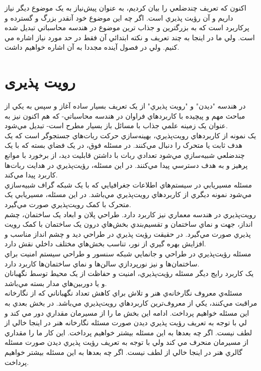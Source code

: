 \documentclass{book}
\begin{document}
                اکنون که تعريف چندضلعي را بيان کرديم، به عنوان پيش‌نياز به يک موضوع ديگر نياز داريم و آن رؤيت پذيري است. اگر چه اين موضوع خود آنقدر بزرگ و گسترده و پرکاربرد است که به بزرگترين و جذاب ترين موضوع در هندسه محاسباتي تبديل شده است. ولي ما در اينجا به چند تعريف و نکته ابتدائي آن فقط در حد مورد نياز اشاره مي کنيم. ولي در فصول آينده مجددا به آن اشاره خواهيم داشت.
                \section*{رویت پذیری}
                در هندسه "ديدن" و "رويت پذيري" از يک تعريف بسيار ساده آغاز و سپس به يکي از مباحث مهم و پيچيده با کاربردهاي فراوان در هندسه محاسباتي- که هم اکنون نيز به عنوان يک زمينه علمي جذاب با مسائل باز بسيار مطرح است- تبديل مي‌شود.\\
                
                يک نمونه از کاربردهاي رويت‌پذيري، بهينه‌سازي حرکت ربات‌هاي جستجوگر است که يک هدف ثابت يا متحرک را دنبال مي‌کنند. در مسئله فوق، در يک فضاي بسته که با يک چندضلعي شبيه‌سازي مي‌شود  تعدادي ربات‌ با داشتن قابليت ديد، از برخورد با موانع پرهيز و به هدف دسترسي پيدا مي‌کنند. در اين مسئله، رؤيت‌پذيري در هدايت ربات‌ها کاربرد پيدا مي‌کند.\\
                مسئله مسير‌يابي در سيستم‌هاي اطلاعات جغرافيايي که با يک شبکه گراف شبيه‌سازي مي‌شود نمونه ديگري از کاربرد‌هاي رويت‌پذيري مي‌باشد. در اين مسئله، مسيريابي يک متحرک با کمک رويت‌پذيري صورت مي‌گيرد.\\
                رويت‌پذيري در هندسه معماري نيز کاربرد دارد. طراحي پلان و ابعاد يک ساختمان، چشم انداز، جهت و نماي ساختمان و تقسيم‌بندي بخش‌هاي درون يک ساختمان با کمک رويت پذيري صورت مي‌گيرد. در حقيقت رؤيت پذيري در طراحي ديد و چشم انداز مناسب و افزايش  بهره گيري از نور، تناسب بخش‌هاي مختلف داخلي نقش دارد. \\
                مسئله رؤيت‌پذيري در طراحي و جانمايي شبکه سنسور و طراحي سيستم امنيت براي ساختمان‌ها و نيز نورپردازي سالن‌ها و نماي ساختمان‌ها کاربرد دارد.\\
                يک کاربرد رايج ديگر مسئله رؤيت‌پذيري، امنيت و حفاظت از يک محيط توسط نگهبانان و يا دوربين‌هاي مدار بسته مي‌باشد. \\
                مسئله‌ي معروف نگارخانه‌ي هنر و تلاش براي کاهش تعداد نگهباناني که از نگارخانه مراقبت مي‌کنند،  يکي از معروف‌ترين کاربردهاي رويت‌پذيري مي‌باشد. در بخش بعدي به اين مسئله خواهيم پرداخت. ادامه اين بخش ما را از مسيرمان مقداري دور مي کند و لي با توجه به تعريف رؤيت پذيري ديدن صورت مسئله نگارخانه هنر در اينجا خالي از لطف نيست. اگر چه بعدها به اين مسئله بيشتر خواهيم پرداخت. اين کار ما را مقداري از مسيرمان منحرف مي کند ولي با توجه به تعريف رؤيت پذيري ديدن صورت مسئله گالري هنر در اينجا خالي از لطف نيست. اگر چه بعدها به اين مسئله بيشتر خواهيم پرداخت.\\
\end{document}
